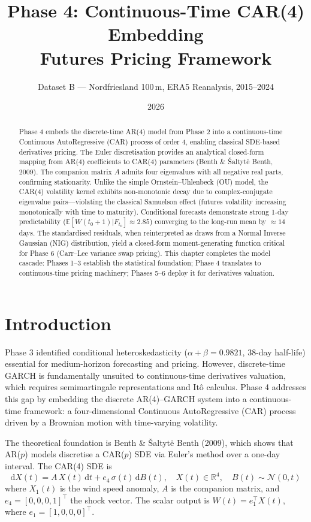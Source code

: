\documentclass[11pt, a4paper, twoside]{article}
\title{\textbf{Phase 4: Continuous-Time CAR(4) Embedding \\ Futures Pricing Framework}}
\author{Dataset B --- Nordfriesland 100\,m, ERA5 Reanalysis, 2015--2024}
\date{2026}
\begin{document}
\maketitle

\begin{abstract}
Phase 4 embeds the discrete-time AR(4) model from Phase 2 into a continuous-time Continuous AutoRegressive (CAR) process of order 4, enabling classical SDE-based derivatives pricing. The Euler discretisation provides an analytical closed-form mapping from AR(4) coefficients to CAR(4) parameters (Benth \& Šaltytė Benth, 2009). The companion matrix $A$ admits four eigenvalues with all negative real parts, confirming stationarity. Unlike the simple Ornstein--Uhlenbeck (OU) model, the CAR(4) volatility kernel exhibits non-monotonic decay due to complex-conjugate eigenvalue pairs---violating the classical Samuelson effect (futures volatility increasing monotonically with time to maturity). Conditional forecasts demonstrate strong 1-day predictability ($\mathbb{E}[W(t_0+1)|F_{t_0}] \approx 2.85$) converging to the long-run mean by $\approx 14$ days. The standardised residuals, when reinterpreted as draws from a Normal Inverse Gaussian (NIG) distribution, yield a closed-form moment-generating function critical for Phase 6 (Carr--Lee variance swap pricing). This chapter completes the model cascade: Phases 1--3 establish the statistical foundation; Phase 4 translates to continuous-time pricing machinery; Phases 5--6 deploy it for derivatives valuation.
\end{abstract}

\section{Introduction}

Phase 3 identified conditional heteroskedasticity ($\alpha+\beta = 0.9821$, 38-day half-life) essential for medium-horizon forecasting and pricing. However, discrete-time GARCH is fundamentally unsuited to continuous-time derivatives valuation, which requires semimartingale representations and Itô calculus. Phase 4 addresses this gap by embedding the discrete AR(4)--GARCH system into a continuous-time framework: a four-dimensional Continuous AutoRegressive (CAR) process driven by a Brownian motion with time-varying volatility.

The theoretical foundation is Benth \& Šaltytė Benth (2009), which shows that AR($p$) models discretise a CAR($p$) SDE via Euler's method over a one-day interval. The CAR(4) SDE is
\begin{equation}
\mathrm{d}X(t) = A \, X(t) \, \mathrm{d}t + e_4 \, \sigma(t) \, \mathrm{d}B(t), \quad X(t) \in \mathbb{R}^4, \quad B(t) \sim \mathcal{N}(0, t)
\end{equation}
where $X_1(t)$ is the wind speed anomaly, $A$ is the companion matrix, and $e_4 = [0,0,0,1]^{\top}$ the shock vector. The scalar output is $W(t) = e_1^{\top} X(t)$, where $e_1 = [1,0,0,0]^{\top}$.
\end{document}
